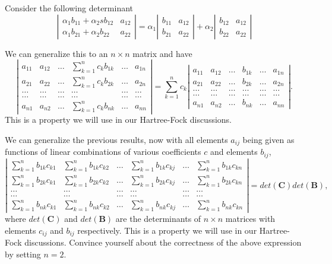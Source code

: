 Consider the following determinant
\[
\left| \begin{array}{cc} \alpha_1b_{11}+\alpha_2sb_{12}& a_{12}\\
                         \alpha_1b_{21}+\alpha_2b_{22}&a_{22}\end{array} \right|=\alpha_1\left|\begin{array}{cc} b_{11}& a_{12}\\
                         b_{21}&a_{22}\end{array} \right|+\alpha_2\left| \begin{array}{cc} b_{12}& a_{12}\\b_{22}&a_{22}\end{array} \right|
\]

We can generalize this to  an $n\times n$ matrix and have 
\[
\left| \begin{array}{cccccc} a_{11}& a_{12} & \dots & \sum_{k=1}^n c_k b_{1k} &\dots & a_{1n}\\
a_{21}& a_{22} & \dots & \sum_{k=1}^n c_k b_{2k} &\dots & a_{2n}\\
\dots & \dots & \dots & \dots & \dots & \dots \\
\dots & \dots & \dots & \dots & \dots & \dots \\
a_{n1}& a_{n2} & \dots & \sum_{k=1}^n c_k b_{nk} &\dots & a_{nn}\end{array} \right|=
\sum_{k=1}^n c_k\left| \begin{array}{cccccc} a_{11}& a_{12} & \dots &  b_{1k} &\dots & a_{1n}\\
a_{21}& a_{22} & \dots &  b_{2k} &\dots & a_{2n}\\
\dots & \dots & \dots & \dots & \dots & \dots\\
\dots & \dots & \dots & \dots & \dots & \dots\\
a_{n1}& a_{n2} & \dots &  b_{nk} &\dots & a_{nn}\end{array} \right| .
\]
This is a property we will use in our Hartree-Fock discussions. 

We can generalize the previous results, now 
with all elements $a_{ij}$  being given as functions of 
linear combinations  of various coefficients $c$ and elements $b_{ij}$,
\[
\left| \begin{array}{cccccc} \sum_{k=1}^n b_{1k}c_{k1}& \sum_{k=1}^n b_{1k}c_{k2} & \dots & \sum_{k=1}^n b_{1k}c_{kj}  &\dots & \sum_{k=1}^n b_{1k}c_{kn}\\
\sum_{k=1}^n b_{2k}c_{k1}& \sum_{k=1}^n b_{2k}c_{k2} & \dots & \sum_{k=1}^n b_{2k}c_{kj} &\dots & \sum_{k=1}^n b_{2k}c_{kn}\\
\dots & \dots & \dots & \dots & \dots & \dots \\
\dots & \dots & \dots & \dots & \dots &\dots \\
\sum_{k=1}^n b_{nk}c_{k1}& \sum_{k=1}^n b_{nk}c_{k2} & \dots & \sum_{k=1}^n b_{nk}c_{kj} &\dots & \sum_{k=1}^n b_{nk}c_{kn}\end{array} \right|=det(\mathbf{C})det(\mathbf{B}),
\]
where $det(\mathbf{C})$ and $det(\mathbf{B})$ are the determinants of $n\times n$ matrices
with elements $c_{ij}$ and $b_{ij}$ respectively.  
This is a property we will use in our Hartree-Fock discussions. Convince yourself about the correctness of the above expression by setting $n=2$. 

